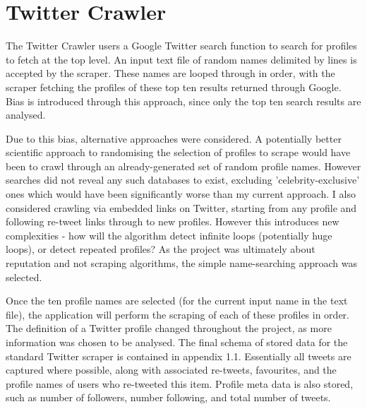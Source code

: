 
\section{Twitter Crawler}

The Twitter Crawler users a Google Twitter search function to search for profiles to fetch at the top level. An input text file of random names delimited by lines is accepted by the scraper. These names are looped through in order, with the scraper fetching the profiles of these top ten results returned through Google. Bias is introduced through this approach, since only the top ten search results are analysed. 


Due to this bias, alternative approaches were considered. A potentially better scientific approach to randomising the selection of profiles to scrape would have been to crawl through an already-generated set of random profile names. However searches did not reveal any such databases to exist, excluding 'celebrity-exclusive' ones which would have been significantly worse than my current approach. I also considered crawling via embedded links on Twitter, starting from any profile and following re-tweet links through to new profiles. However this introduces new complexities - how will the algorithm detect infinite loops (potentially huge loops), or detect repeated profiles? As the project was ultimately about reputation and not scraping algorithms, the simple name-searching approach was selected. 

Once the ten profile names are selected (for the current input name in the text file), the application will perform the scraping of each of these profiles in order.  The definition of a Twitter profile changed throughout the project, as more information was chosen to be analysed. The final schema of stored data for the standard Twitter scraper is contained in appendix 1.1. Essentially all tweets are captured where possible, along with associated re-tweets, favourites, and the profile names of users who re-tweeted this item. Profile meta data is also stored, such as number of followers, number following, and total number of tweets. 

